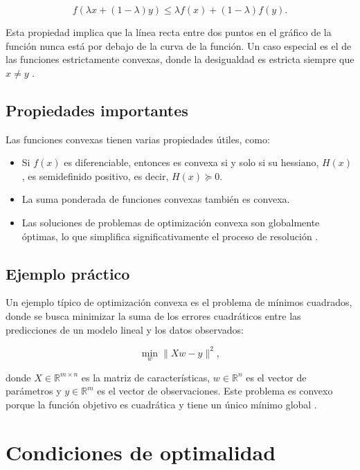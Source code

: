 \begin{equation}
	f(\lambda x + (1 - \lambda)y) \leq \lambda f(x) + (1 - \lambda)f(y).
\end{equation}

Esta propiedad implica que la línea recta entre dos puntos en el gráfico de la función nunca está por debajo de la curva de la función. Un caso especial es el de las funciones estrictamente convexas, donde la desigualdad es estricta siempre que \(x \neq y\) \cite{nocedal1999optimization}.

\subsection{Propiedades importantes}

Las funciones convexas tienen varias propiedades útiles, como:
\begin{itemize}
	\item Si \(f(x)\) es diferenciable, entonces es convexa si y solo si su hessiano, \(H(x)\), es semidefinido positivo, es decir, \(H(x) \succeq 0\).
	\item La suma ponderada de funciones convexas también es convexa.
	\item Las soluciones de problemas de optimización convexa son globalmente óptimas, lo que simplifica significativamente el proceso de resolución \cite{boyd2004convex}.
\end{itemize}

\subsection{Ejemplo práctico}

Un ejemplo típico de optimización convexa es el problema de mínimos cuadrados, donde se busca minimizar la suma de los errores cuadráticos entre las predicciones de un modelo lineal y los datos observados:

\begin{equation}
	\min_{w} \|Xw - y\|^2,
\end{equation}

donde \(X \in \mathbb{R}^{m \times n}\) es la matriz de características, \(w \in \mathbb{R}^n\) es el vector de parámetros y \(y \in \mathbb{R}^m\) es el vector de observaciones. Este problema es convexo porque la función objetivo es cuadrática y tiene un único mínimo global \cite{boyd2004convex}.

\section{Condiciones de optimalidad}

